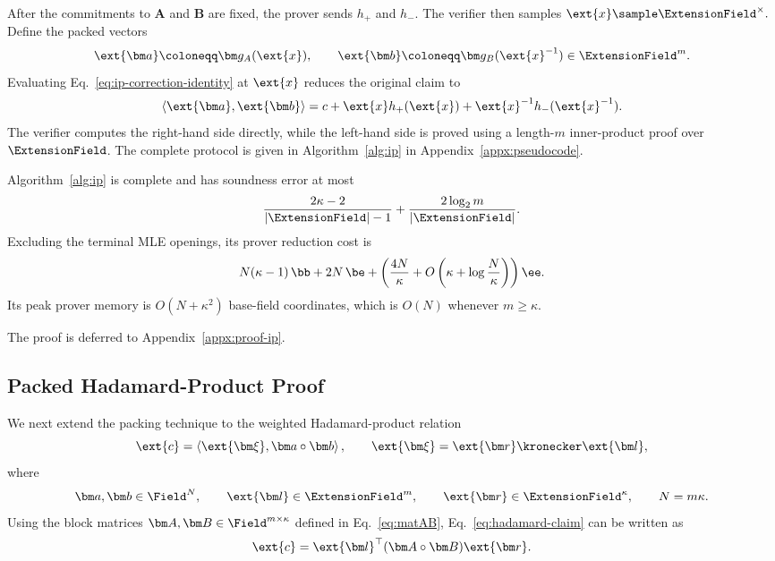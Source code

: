 After the commitments to \(\bm A\) and \(\bm B\) are fixed, the
prover sends \(h_+\) and \(h_-\). The verifier then samples
\(
    \ext{x}\sample\ExtensionField^\times.
\)
Define the packed vectors
\[
    \ext{\bm a}
    \coloneqq
    \bm g_A(\ext{x}),
    \qquad
    \ext{\bm b}
    \coloneqq
    \bm g_B(\ext{x}^{-1})
    \in\ExtensionField^m.
\]
Evaluating Eq.~\eqref{eq:ip-correction-identity} at \(\ext{x}\)
reduces the original claim to
\begin{equation}
    \left\langle
        \ext{\bm a},\ext{\bm b}
    \right\rangle
    =
    c
    +\ext{x}h_+(\ext{x})
    +\ext{x}^{-1}h_-(\ext{x}^{-1}).
\label{eq:packed-inner-product-check}
\end{equation}
The verifier computes the right-hand side directly, while the
left-hand side is proved using a length-\(m\) inner-product proof
over \(\ExtensionField\). The complete protocol is given in
Algorithm~\ref{alg:ip} in Appendix~\ref{appx:pseudocode}.

\begin{proposition}
\label{proposition:ip-complexity}
Algorithm~\ref{alg:ip} is complete and has soundness error at most
\[
    \frac{2\kappa-2 }{|\ExtensionField|-1} + \frac{2\log_2 m}{|\ExtensionField|}.
\]
Excluding the terminal MLE openings, its prover reduction cost is
\[
    N(\kappa-1)\,\bb
    +
    2N\,\be
    +
    \left(
        \frac{4N}{\kappa}
        +
        O\left(
            \kappa+\log\frac{N}{\kappa}
        \right)
    \right)\ee.
\]
Its peak prover memory is \(O(N+\kappa^2)\) base-field
coordinates, which is \(O(N)\) whenever \(m\geq\kappa\).
\end{proposition}

The proof is deferred to Appendix~\ref{appx:proof-ip}.

\subsection{Packed Hadamard-Product Proof}
\label{sec:hadamard}

We next extend the packing technique to the weighted
Hadamard-product relation
\begin{equation}
    \ext{c}
    =
    \left\langle
        \ext{\bm\xi},
        \bm a\circ\bm b
    \right\rangle,
    \qquad
    \ext{\bm\xi}
    =
    \ext{\bm r}\kronecker\ext{\bm l},
\label{eq:hadamard-claim}
\end{equation}
where
\[
    \bm a,\bm b\in\Field^N,
    \qquad
    \ext{\bm l}\in\ExtensionField^m,
    \qquad
    \ext{\bm r}\in\ExtensionField^\kappa,
    \qquad
    N=m\kappa.
\]
Using the block matrices \(\bm A,\bm B\in\Field^{m\times\kappa}\)
defined in Eq.~\eqref{eq:matAB}, Eq.~\eqref{eq:hadamard-claim}
can be written as
\begin{equation*}
    \ext{c}
    =
    \ext{\bm l}^{\top}
    (\bm A\circ\bm B)
    \ext{\bm r}.
\end{equation*}

